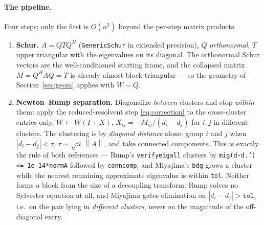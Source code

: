 \documentclass[11pt,a4paper]{article}
\newcommand{\norm}[1]{\left\|#1\right\|}
\newcommand{\abs}[1]{\left|#1\right|}
\theoremstyle{plain}
\theoremstyle{definition}
\begin{document}
\paragraph{The pipeline.} Four steps; only the first is $O(n^3)$ beyond the per-step
matrix products.
\begin{enumerate}
  \item \textbf{Schur.} $A=QTQ^{H}$ (\texttt{GenericSchur} in extended precision), $Q$
    \emph{orthonormal}, $T$ upper triangular with the eigenvalues on its diagonal. The
    orthonormal Schur vectors are the well-conditioned starting frame, and the collapsed
    matrix $M=Q^{H}AQ=T$ is already almost block-triangular --- so the geometry of
    Section~\ref{sec:geom} applies with $W=Q$.
  \item \textbf{Newton--Rump separation.} Diagonalize \emph{between} clusters and stop
    \emph{within} them: apply the reduced-resolvent step \eqref{eq:correction} to the
    cross-cluster entries only, $W\leftarrow W(I+X)$, $X_{ij}=-M_{ij}/(d_i-d_j)$ for $i,j$
    in different clusters. The clustering is by \emph{diagonal distance} alone: group
    $i$ and $j$ when $\abs{d_i-d_j}<\tau$, $\tau\sim\sqrt u\,\norm A$, and take connected
    components. This is exactly the rule of both references --- Rump's
    \texttt{verifyeigall} clusters by \texttt{mig(d-d.')\,<=\,1e-14*normA} followed by
    \texttt{conncomp}, and Miyajima's \texttt{bdg} grows a cluster while the nearest
    remaining approximate eigenvalue is within \texttt{tol}. Neither forms a block from
    the size of a decoupling transform: Rump solves no Sylvester equation at all, and
    Miyajima gates elimination on $\abs{d_i-d_j}>\texttt{tol}$, i.e.\ on the pair lying in
    \emph{different clusters}, never on the magnitude of the off-diagonal entry.


\end{enumerate}
\end{document}
